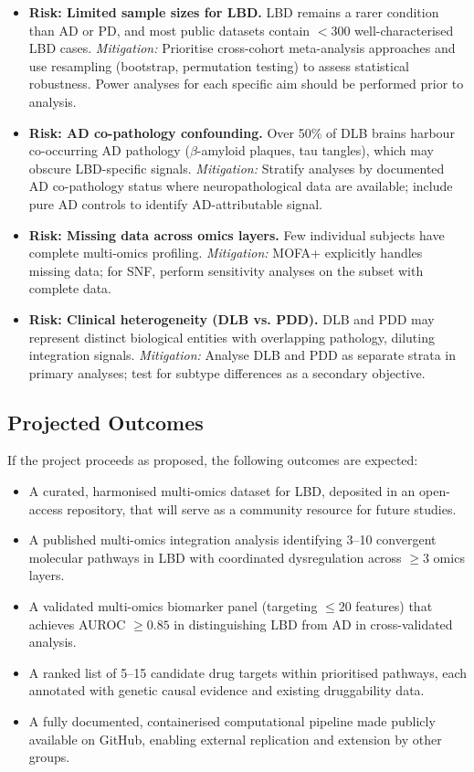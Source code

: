 \begin{itemize}
    \item \textbf{Risk: Limited sample sizes for LBD.} LBD remains a rarer condition than AD or PD, and most public datasets contain $<300$ well-characterised LBD cases. \textit{Mitigation:} Prioritise cross-cohort meta-analysis approaches and use resampling (bootstrap, permutation testing) to assess statistical robustness. Power analyses for each specific aim should be performed prior to analysis.
    \item \textbf{Risk: AD co-pathology confounding.} Over 50\% of DLB brains harbour co-occurring AD pathology ($\beta$-amyloid plaques, tau tangles), which may obscure LBD-specific signals. \textit{Mitigation:} Stratify analyses by documented AD co-pathology status where neuropathological data are available; include pure AD controls to identify AD-attributable signal.
    \item \textbf{Risk: Missing data across omics layers.} Few individual subjects have complete multi-omics profiling. \textit{Mitigation:} MOFA+ explicitly handles missing data; for SNF, perform sensitivity analyses on the subset with complete data.
    \item \textbf{Risk: Clinical heterogeneity (DLB vs. PDD).} DLB and PDD may represent distinct biological entities with overlapping pathology, diluting integration signals. \textit{Mitigation:} Analyse DLB and PDD as separate strata in primary analyses; test for subtype differences as a secondary objective.
\end{itemize}

\subsection{Projected Outcomes}

If the project proceeds as proposed, the following outcomes are expected:

\begin{itemize}
    \item A curated, harmonised multi-omics dataset for LBD, deposited in an open-access repository, that will serve as a community resource for future studies.
    \item A published multi-omics integration analysis identifying 3--10 convergent molecular pathways in LBD with coordinated dysregulation across $\geq 3$ omics layers.
    \item A validated multi-omics biomarker panel (targeting $\leq 20$ features) that achieves AUROC $\geq 0.85$ in distinguishing LBD from AD in cross-validated analysis.
    \item A ranked list of 5--15 candidate drug targets within prioritised pathways, each annotated with genetic causal evidence and existing druggability data.
    \item A fully documented, containerised computational pipeline made publicly available on GitHub, enabling external replication and extension by other groups.
\end{itemize}

